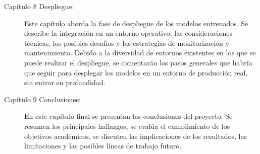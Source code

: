 \begin{description}
\item[Capítulo 8 Despliegue:] Este capítulo aborda la fase de despliegue de los modelos entrenados. Se describe la integración en un entorno operativo, las consideraciones técnicas, los posibles desafíos y las estrategias de monitorización y mantenimiento. Debido a la diversidad de entornos existentes en los que se puede realizar el despliegue, se comentarán los pasos generales que habría que seguir para desplegar los modelos en un entorno de producción real, sin entrar en profundidad.



\item[Capítulo 9 Conclusiones:] En este capítulo final se presentan las conclusiones del proyecto. Se resumen los principales hallazgos, se evalúa el cumplimiento de los objetivos académicos, se discuten las implicaciones de los resultados, las limitaciones y las posibles líneas de trabajo futuro.
\end{description}
